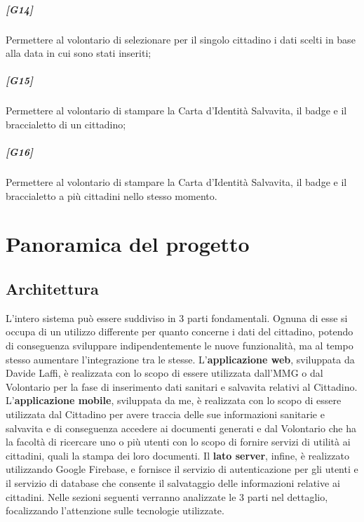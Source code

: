 \documentclass[12pt,a4paper,twoside,openright,titlepage]{book}
\begin{document}
\paragraph{[G14]} Permettere al volontario di selezionare per il singolo cittadino i dati scelti in base alla data in cui sono stati inseriti;
\paragraph{[G15]} Permettere al volontario di stampare la Carta d'Identità Salvavita, il badge e il braccialetto di un cittadino;
\paragraph{[G16]} Permettere al volontario di stampare la Carta d'Identità Salvavita, il badge e il braccialetto a più cittadini nello stesso momento.


\chapter{Panoramica del progetto}

\section{Architettura}
L'intero sistema può essere suddiviso in 3 parti fondamentali. Ognuna di esse si occupa di un utilizzo differente per quanto concerne i dati del cittadino, potendo di conseguenza sviluppare indipendentemente le nuove funzionalità, ma al tempo stesso aumentare l'integrazione tra le stesse.\newline
L'\textbf{applicazione web}, sviluppata da Davide Laffi, è realizzata con lo scopo di essere utilizzata dall'MMG o dal Volontario per la fase di inserimento dati sanitari e salvavita relativi al Cittadino.\newline
L'\textbf{applicazione mobile}, sviluppata da me, è realizzata con lo scopo di essere utilizzata dal Cittadino per avere traccia delle sue informazioni sanitarie e salvavita e di conseguenza accedere ai documenti generati e dal Volontario che ha la facoltà di ricercare uno o più utenti con lo scopo di fornire servizi di utilità ai cittadini, quali la stampa dei loro documenti.\newline
Il \textbf{lato server}, infine, è realizzato utilizzando Google Firebase, e fornisce il servizio di autenticazione per gli utenti e il servizio di database che consente il salvataggio delle informazioni relative ai cittadini.\newline
Nelle sezioni seguenti verranno analizzate le 3 parti nel dettaglio, focalizzando l'attenzione sulle tecnologie utilizzate.\newline
\end{document}
